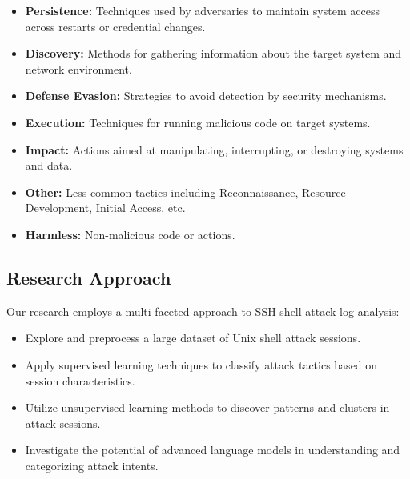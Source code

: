         \begin{itemize}
            \item \textbf{Persistence:} Techniques used by adversaries to maintain system access across restarts or credential changes.
            \item \textbf{Discovery:} Methods for gathering information about the target system and network environment.
            \item \textbf{Defense Evasion:} Strategies to avoid detection by security mechanisms.
            \item \textbf{Execution:} Techniques for running malicious code on target systems.
            \item \textbf{Impact:} Actions aimed at manipulating, interrupting, or destroying systems and data.
            \item \textbf{Other:} Less common tactics including Reconnaissance, Resource Development, Initial Access, etc.
            \item \textbf{Harmless:} Non-malicious code or actions.
        \end{itemize}

    \subsection{Research Approach}
    
        Our research employs a multi-faceted approach to SSH shell attack log analysis:

        \begin{itemize}
            \item Explore and preprocess a large dataset of Unix shell attack sessions.
            \item Apply supervised learning techniques to classify attack tactics based on session characteristics.
            \item Utilize unsupervised learning methods to discover patterns and clusters in attack sessions.
            \item Investigate the potential of advanced language models in understanding and categorizing attack intents.
        \end{itemize}

